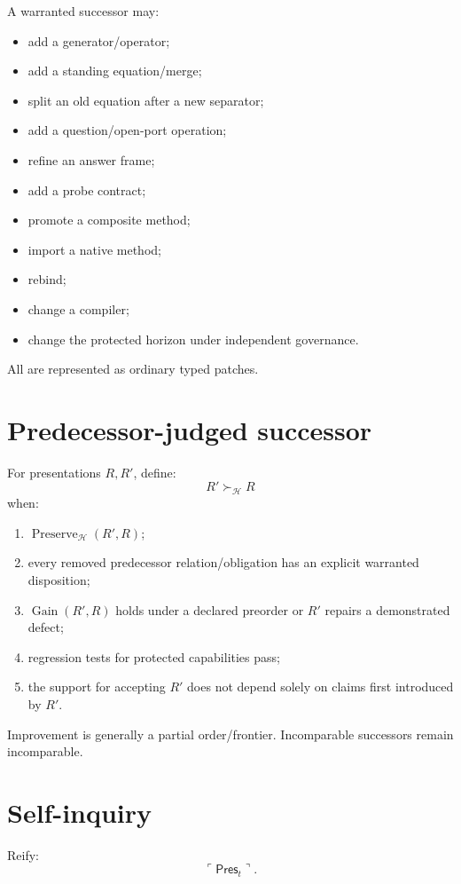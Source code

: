 \documentclass[11pt,oneside]{article}
\newcommand{\Preserve}{\operatorname{Preserve}}
\newcommand{\Gain}{\operatorname{Gain}}
\begin{document}
A warranted successor may:
\begin{itemize}
\item add a generator/operator;
\item add a standing equation/merge;
\item split an old equation after a new separator;
\item add a question/open-port operation;
\item refine an answer frame;
\item add a probe contract;
\item promote a composite method;
\item import a native method;
\item rebind;
\item change a compiler;
\item change the protected horizon under independent governance.
\end{itemize}

All are represented as ordinary typed patches.

\section{Predecessor-judged successor}

For presentations \(R,R'\), define:
\[
\boxed{
R'\succ_{\mathcal H}R
}
\]
when:
\begin{enumerate}
\item \(\Preserve_{\mathcal H}(R',R)\);
\item every removed predecessor relation/obligation has an explicit warranted disposition;
\item \(\Gain(R',R)\) holds under a declared preorder or \(R'\) repairs a demonstrated defect;
\item regression tests for protected capabilities pass;
\item the support for accepting \(R'\) does not depend solely on claims first introduced by \(R'\).
\end{enumerate}

Improvement is generally a partial order/frontier.  Incomparable successors remain incomparable.

\section{Self-inquiry}

Reify:
\[
\ulcorner\mathsf{Pres}_t\urcorner.
\]
\end{document}

